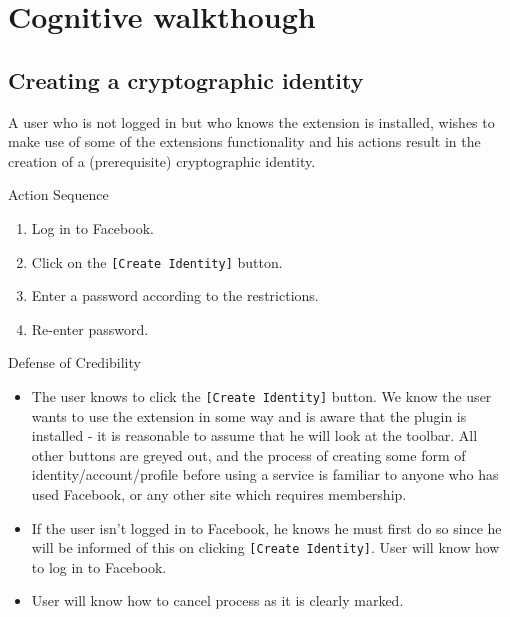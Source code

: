 \chapter{Cognitive walkthough}


\section{Creating a cryptographic identity}
A user who is not logged in but who knows the extension is installed, wishes to make use of some of the extensions functionality and his actions result in the creation of a (prerequisite) cryptographic identity.

\begin{desc}

    \item[Action Sequence] \hfill
    
    \begin{enumerate}
        \item Log in to Facebook.
        \item Click on the {\tt [Create Identity]} button.
        \item Enter a password according to the restrictions.
        \item Re-enter password.
    \end{enumerate}
    
    \item[Defense of Credibility] \hfill
        \begin{itemize}
            
            \item The user knows to click the {\tt [Create Identity]} button. We know the user wants to use the extension in some way and is aware that the plugin is installed - it is reasonable to assume that he will look at the toolbar. All other buttons are greyed out, and the process of creating some form of identity/account/profile before using a service is familiar to anyone who has used Facebook, or any other site which requires membership.
            
            \item If the user isn't logged in to Facebook, he knows he must first do so since he will be informed of this on clicking {\tt [Create Identity]}. User will know how to log in to Facebook.
            
            \item User will know how to cancel process as it is clearly marked.
            

\end{itemize}
\end{desc}
